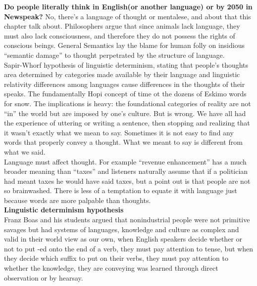 \documentclass[13pt,letterpaper,onecolumn]{report}
\begin{document}
\hspace{1em}\textbf{Do people literally think in English(or another language) or by 2050 in Newspeak?} No, there’s a language of thought or mentalese, and about that this chapter talk about. Philosophers argue that since animals lack language, they must also lack consciousness, and therefore they do not possess the rights of conscious beings. General Semantics lay the blame for human folly on insidious “semantic damage” to thought perpetrated by the structure of language.\\

\hspace{1em}Sapir-Whorf hypothesis of linguistic determinism, stating that people’s thoughts area determined by categories made available by their language and linguistic relativity differences among languages cause differences in the thoughts of their speaks. The fundamentally Hopi concept of time ot the dozens of Eskimo words for snow. The implications is heavy: the foundational categories of reality are not “in” the world but are imposed by one’s culture. But is wrong. We have all had the experience of uttering or writing a sentence, then stopping and realizing that it wasn’t exactly what we mean to say. Sometimes it is not easy to find any words that properly convey a thought. What we meant to say is different from what we said.\\

\hspace{1em}Language must affect thought. For example “revenue enhancement” has a much broader meaning than “taxes” and listeners naturally assume that if a politician had meant taxes he would have said taxes, but a point out is that people are not so brainwashed. There is less of a temptation to equate it with language just because words are more palpable than thoughts.
\\

\textbf{Linguistic determinism hypothesis}\\
\hspace{1em}Franz Boas and his students argued that nonindustrial people were not primitive savages but had systems of languages, knowledge and culture as complex and valid in their world view as our own, when English speakers decide whether or not to put -ed onto the end of a verb, they must pay attention to tense, but when they decide which suffix to put on their verbs, they must pay attention to whether the knowledge, they are conveying was learned through direct observation or by hearsay.\\
\end{document}

